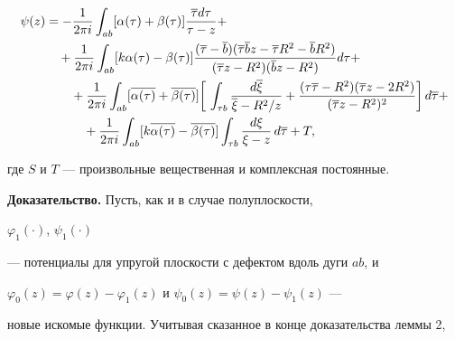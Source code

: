 \begin{lem}
\begin{align}
%


\psi(z) &= - \frac{1}{2\pi i} \int_{ab} [\alpha(\tau)+\beta(\tau)]


\frac{\overline{\tau}d\tau}{\tau-z}+ \notag \\


%


&\quad + \frac{1}{2\pi i} \int_{ab} [k\alpha(\tau)-\beta(\tau)]


\frac{(\overline{\tau}-\overline{b})


(\overline{\tau}\overline{b}z-\overline{\tau}R^2-\overline{b}R^2)}


{(\overline{\tau}z-R^2)(\overline{b}z-R^2)}d\tau +\notag \\


%


&\quad\quad + \frac{1}{2\pi i} \int_{ab} [\overline{\alpha(\tau)}


+\overline{\beta(\tau)}]\bigg[\,


\int_{\tau b}\frac{d\overline{\xi}}{\overline{\xi}-R^2/z}


+ \frac{(\tau\overline{\tau}-R^2)(\overline{\tau}z-2R^2)}


{(\overline{\tau}z-R^2)^2}


\bigg]\,d\overline{\tau} + \notag \\


%


&\quad\quad\quad + \frac{1}{2\pi i} \int_{ab} [k\overline{\alpha(\tau)}


-\overline{\beta(\tau)}]


\int_{\tau b}\frac{d\xi}{\xi-z}\,d\overline{\tau} + T ,


\end{align}


где $S$ и $T$ --- произвольные вещественная и комплексная постоянные.


\end{lem}





{\bf Доказательство.} Пусть, как и в случае полуплоскости,


$\varphi_1(\cdot)$, $\psi_1(\cdot)$


--- потенциалы для упругой плоскости с дефектом вдоль дуги $ab$, и


$\varphi_0(z)=\varphi(z)-\varphi_1(z)$ и $\psi_0(z)=\psi(z)-\psi_1(z)$ ---


новые искомые функции. Учитывая сказанное в конце доказательства леммы 2,


